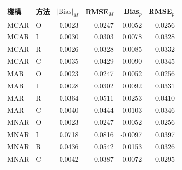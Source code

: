 \begin{tabular}{@{}llrrrr@{}}
\hline
機構 & 方法 & $|\mathrm{Bias}|_M$ & RMSE$_M$ & Bias$_p$ & RMSE$_p$\\
\hline
MCAR & O & 0.0023 & 0.0247 & 0.0052 & 0.0256\\
MCAR & I & 0.0030 & 0.0303 & 0.0078 & 0.0328\\
MCAR & R & 0.0026 & 0.0328 & 0.0085 & 0.0332\\
MCAR & C & 0.0035 & 0.0429 & 0.0090 & 0.0345\\
MAR & O & 0.0023 & 0.0247 & 0.0052 & 0.0256\\
MAR & I & 0.0028 & 0.0302 & 0.0092 & 0.0331\\
MAR & R & 0.0364 & 0.0511 & 0.0253 & 0.0410\\
MAR & C & 0.0040 & 0.0444 & 0.0103 & 0.0346\\
MNAR & O & 0.0023 & 0.0247 & 0.0052 & 0.0256\\
MNAR & I & 0.0718 & 0.0816 & -0.0097 & 0.0397\\
MNAR & R & 0.0436 & 0.0542 & 0.0153 & 0.0326\\
MNAR & C & 0.0042 & 0.0387 & 0.0072 & 0.0295\\
\hline
\end{tabular}
